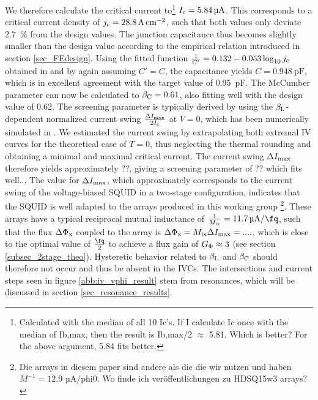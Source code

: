 We therefore calculate the critical current to\footnote{Calculated with the median of all 10 Ic's. If I calculate Ic once with the median of Ib,max, then the result is Ib,max/2 $\approx$ 5.81. Which is better? For the above argument, 5.84 fits better.} $I_{\rm c}=\qty{5.84}{\micro\ampere}$. This corresponds to a critical current density of $j_{\rm c}=\qty{28.8}{\ampere\per\centi\meter\squared}$, such that both values only deviate \qty{2.7}{\percent} from the design values. The junction capacitance thus becomes slightly smaller than the design value according to the empirical relation introduced in section \ref{sec_FEdesign}. Using the fitted function $\frac{1}{C'}=0.132-0.053\log_{10}j_{\rm c}$ obtained in \cite{Bauer2022} and by again assuming $C'=C$, the capacitance yields $C=\qty{0.948}{\pico\farad}$, which is in excellent agreement with the target value of \qty{0.95}{\pico\farad}. The McCumber parameter can now be calculated to $\beta_{\rm C}=0.61$, also fitting well with the design value of 0.62. The screening parameter is typically derived by using the $\beta_{\rm L}$-dependent normalized current swing $\frac{\Delta I_{\rm max}}{2I_{\rm c}}$ at $V=0$, which has been numerically simulated in \cite{Tesche1977}. We estimated the current swing by extrapolating both extremal IV curves for the theoretical case of $T=0$, thus neglecting the thermal rounding and obtaining a minimal and maximal critical current. The current swing $\Delta I_{\rm max}$ therefore yields approximately ??, giving a screening parameter of ?? which fits well... The value for $\Delta I_{\rm max}$, which approximately corresponds to the current swing of the voltage-biased SQUID in a two-stage configuration, indicates that the SQUID is well adapted to the arrays produced in this working group \cite{Kempf2015}\footnote{Die arrays in diesem paper sind andere als die die wir nutzen und haben $M^{-1}=12.9$ µA/phi0. Wo finde ich veröffentlichungen zu HDSQ15w3 arrays?}. These arrays have a typical reciprocal mutual inductance of $\frac{1}{M_{\rm ix}}=\qty{11.7}{\micro\ampere\per\fq}$, such that the flux $\Delta\Phi_{\rm x}$ coupled to the array is $\Delta\Phi_{\rm x}=M_{\rm ix}\Delta I_{\rm max}=....$, which is close to the optimal value of $\frac{\unit{\fq}}{2}$ to achieve a flux gain of $G_{\rm \Phi}\approx 3$ (see section \ref{subsec_2stage_theo}). 
Hysteretic behavior related to $\beta_{\rm L}$ and $\beta_{\rm C}$ should therefore not occur and thus be absent in the IVCs. The intersections and current steps seen in figure \ref{abb:iv_vphi_result} stem from resonances, which will be discussed in section \ref{sec_resonance_results}. \\

